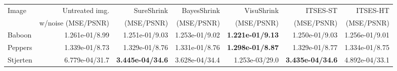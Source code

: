   
\begin{tabular}{l|rrrrrr}
	\toprule
	Image &   Untreated img.  &      SureShrink &   BayesShrink &    VisuShrink &  ITSES-ST &  ITSES-HT \\
	&w/noise (MSE/PSNR)&(MSE/PSNR)&(MSE/PSNR)&(MSE/PSNR)&(MSE/PSNR)&(MSE/PSNR)\\
	\midrule
  Baboon & 1.261e-01/8.99 &          1.251e-01/9.03 & 1.253e-01/9.02 & \textbf{1.221e-01/9.13} & 1.250e-01/9.03 & 1.256e-01/9.01 \\
 Peppers  & 1.339e-01/8.73 &          1.329e-01/8.76 & 1.331e-01/8.76 & \textbf{1.298e-01/8.87} & 1.329e-01/8.77 & 1.334e-01/8.75 \\
Stjerten & 6.779e-04/31.7 & \textbf{3.445e-04/34.6} & 3.628e-04/34.4 & 1.253e-03/29.0 & \textbf{3.435e-04/34.6} & 4.892e-04/33.1 \\
\bottomrule
\end{tabular}
